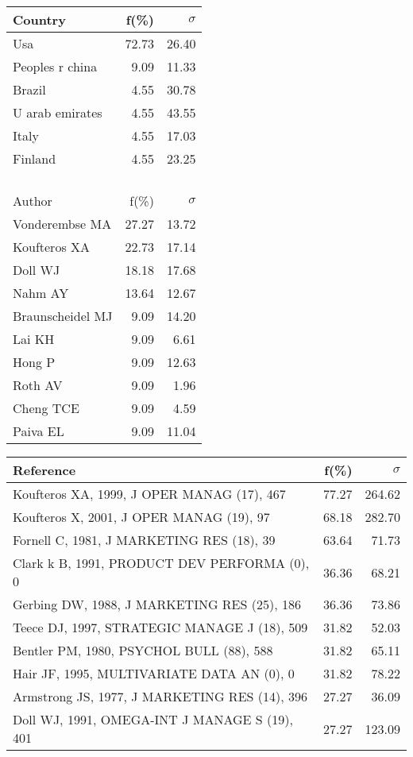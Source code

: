\documentclass[a4paper,11pt]{report}
\begin{document}
\begin{landscape}
\begin{table}[!ht]
{\begin{tabular}{|l r r|}
\hline
\hline
Country & f(\%) & $\sigma$\\
\hline
Usa & 72.73 & 26.40\\
Peoples r china & 9.09 & 11.33\\
Brazil & 4.55 & 30.78\\
U arab emirates & 4.55 & 43.55\\
Italy & 4.55 & 17.03\\
Finland & 4.55 & 23.25\\
 &  & \\
 &  & \\
 &  & \\
 &  & \\
\hline
\hline
Author & f(\%) & $\sigma$\\
\hline
Vonderembse MA & 27.27 & 13.72\\
Koufteros XA & 22.73 & 17.14\\
Doll WJ & 18.18 & 17.68\\
Nahm AY & 13.64 & 12.67\\
Braunscheidel MJ & 9.09 & 14.20\\
Lai KH & 9.09 & 6.61\\
Hong P & 9.09 & 12.63\\
Roth AV & 9.09 & 1.96\\
Cheng TCE & 9.09 & 4.59\\
Paiva EL & 9.09 & 11.04\\
\hline
\end{tabular}
}
{\scriptsize\begin{tabular}{|l r r|}
\hline
Reference & f(\%) & $\sigma$\\
\hline
Koufteros XA, 1999, J OPER MANAG (17), 467 & 77.27 & 264.62\\
Koufteros X, 2001, J OPER MANAG (19), 97 & 68.18 & 282.70\\
Fornell C, 1981, J MARKETING RES (18), 39 & 63.64 & 71.73\\
Clark k B, 1991, PRODUCT DEV PERFORMA (0), 0 & 36.36 & 68.21\\
Gerbing DW, 1988, J MARKETING RES (25), 186 & 36.36 & 73.86\\
Teece DJ, 1997, STRATEGIC MANAGE J (18), 509 & 31.82 & 52.03\\
Bentler PM, 1980, PSYCHOL BULL (88), 588 & 31.82 & 65.11\\
Hair JF, 1995, MULTIVARIATE DATA AN (0), 0 & 31.82 & 78.22\\
Armstrong JS, 1977, J MARKETING RES (14), 396 & 27.27 & 36.09\\
Doll WJ, 1991, OMEGA-INT J MANAGE S (19), 401 & 27.27 & 123.09\\

\end{tabular}}
\end{table}
\end{landscape}
\end{document}
